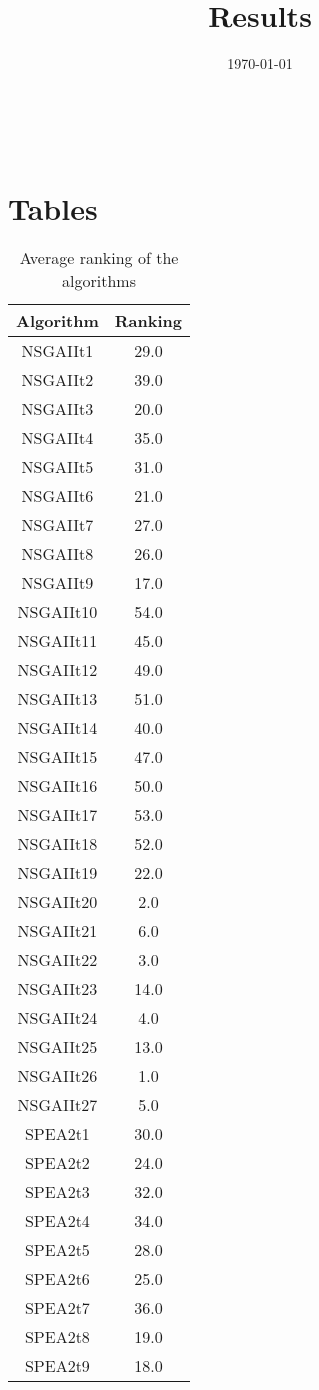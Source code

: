 \documentclass{article}
\title{Results}
\author{}
\date{\today}
\begin{document}
\oddsidemargin 0in \topmargin 0in\maketitle
\
\section{Tables}
\begin{table}[!htp]
\centering
\caption{Average ranking of the algorithms}
\begin{tabular}{c|c}
Algorithm&Ranking\\
\hline
NSGAIIt1&29.0\\
NSGAIIt2&39.0\\
NSGAIIt3&20.0\\
NSGAIIt4&35.0\\
NSGAIIt5&31.0\\
NSGAIIt6&21.0\\
NSGAIIt7&27.0\\
NSGAIIt8&26.0\\
NSGAIIt9&17.0\\
NSGAIIt10&54.0\\
NSGAIIt11&45.0\\
NSGAIIt12&49.0\\
NSGAIIt13&51.0\\
NSGAIIt14&40.0\\
NSGAIIt15&47.0\\
NSGAIIt16&50.0\\
NSGAIIt17&53.0\\
NSGAIIt18&52.0\\
NSGAIIt19&22.0\\
NSGAIIt20&2.0\\
NSGAIIt21&6.0\\
NSGAIIt22&3.0\\
NSGAIIt23&14.0\\
NSGAIIt24&4.0\\
NSGAIIt25&13.0\\
NSGAIIt26&1.0\\
NSGAIIt27&5.0\\
SPEA2t1&30.0\\
SPEA2t2&24.0\\
SPEA2t3&32.0\\
SPEA2t4&34.0\\
SPEA2t5&28.0\\
SPEA2t6&25.0\\
SPEA2t7&36.0\\
SPEA2t8&19.0\\
SPEA2t9&18.0\\

\end{tabular}
\end{table}
\end{document}

